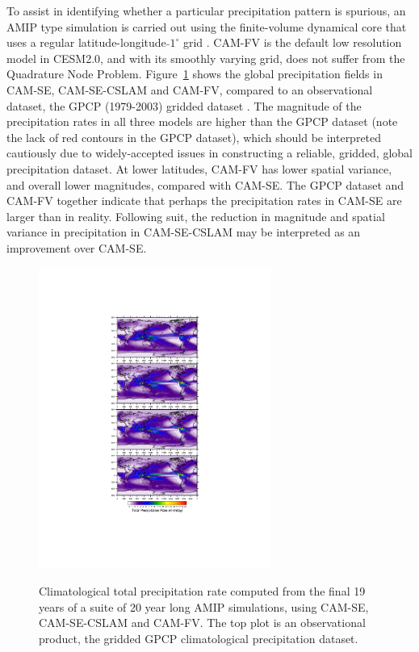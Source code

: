 \documentclass[twocol]{ametsoc}
\begin{document}
{\color{red}To assist in identifying whether a particular precipitation pattern is spurious, an AMIP type simulation is carried out using the finite-volume dynamical core that uses a regular latitude-longitude $\tilde{} 1^\circ$ grid \citep[CAM-FV;][]{CAM5}. CAM-FV is the default low resolution model in CESM2.0, and with its smoothly varying grid, does not suffer from the Quadrature Node Problem. Figure~\ref{fig:AMIP-global} shows the global precipitation fields in CAM-SE, CAM-SE-CSLAM and CAM-FV, compared to an observational dataset, the GPCP (1979-2003) gridded dataset \citep{H2001JH}. The magnitude of the precipitation rates in all three models are higher than the GPCP dataset (note the lack of red contours in the GPCP dataset), which should be interpreted cautiously due to widely-accepted issues in constructing a reliable, gridded, global precipitation dataset. At lower latitudes, CAM-FV has lower spatial variance, and overall lower magnitudes, compared with CAM-SE. The GPCP dataset and CAM-FV together indicate that perhaps the precipitation rates in CAM-SE are larger than in reality. Following suit, the reduction in magnitude and spatial variance in precipitation in CAM-SE-CSLAM may be interpreted as an improvement over CAM-SE.{}} 

\begin{figure}[t]
\noindent\includegraphics[width=18pc,angle=0]{figs/AMIP_global.pdf}\\
\caption{Climatological total precipitation rate computed from the final 19 years of a suite of 20 year long AMIP simulations, using CAM-SE, CAM-SE-CSLAM and CAM-FV. The top plot is an observational product, the gridded GPCP climatological precipitation dataset.}
\label{fig:AMIP-global}
\end{figure}
\end{document}
